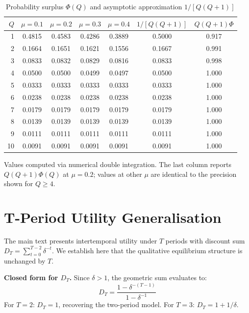 \documentclass[
    oneside,
    fontsize=10pt,leqno]{article}
\begin{document}
\begin{table}[H]
\centering
\caption{\label{tab:phi_values}Probability surplus $\Phi(Q)$ and
asymptotic approximation $1/[Q(Q+1)]$}
\smallskip
\begin{tabular}{rcccccc}
\toprule
$Q$ & $\mu=0.1$ & $\mu=0.2$ & $\mu=0.3$ & $\mu=0.4$
    & $1/[Q(Q\!+\!1)]$ & $Q(Q\!+\!1)\Phi$\\
\midrule
1  & 0.4815 & 0.4583 & 0.4286 & 0.3889 & 0.5000 & 0.917\\
2  & 0.1664 & 0.1651 & 0.1621 & 0.1556 & 0.1667 & 0.991\\
3  & 0.0833 & 0.0832 & 0.0829 & 0.0816 & 0.0833 & 0.998\\
4  & 0.0500 & 0.0500 & 0.0499 & 0.0497 & 0.0500 & 1.000\\
5  & 0.0333 & 0.0333 & 0.0333 & 0.0333 & 0.0333 & 1.000\\
6  & 0.0238 & 0.0238 & 0.0238 & 0.0238 & 0.0238 & 1.000\\
7  & 0.0179 & 0.0179 & 0.0179 & 0.0179 & 0.0179 & 1.000\\
8  & 0.0139 & 0.0139 & 0.0139 & 0.0139 & 0.0139 & 1.000\\
9  & 0.0111 & 0.0111 & 0.0111 & 0.0111 & 0.0111 & 1.000\\
10 & 0.0091 & 0.0091 & 0.0091 & 0.0091 & 0.0091 & 1.000\\
\bottomrule
\end{tabular}
\begin{minipage}{\textwidth}
\smallskip
{\footnotesize Values computed via numerical double integration. The
last column reports $Q(Q+1)\Phi(Q)$ at $\mu=0.2$; values at other
$\mu$ are identical to the precision shown for $Q\geq4$.}
\end{minipage}
\end{table}

\section{T-Period Utility Generalisation}\label{sec:appendix_Tperiod}

The main text presents intertemporal utility under $T$ periods with
discount sum $D_{T}=\sum_{t=0}^{T-2}\delta^{-t}$. We establish
here that the qualitative equilibrium structure is unchanged by $T$.

\medskip
\noindent\textbf{Closed form for $D_{T}$.} Since $\delta>1$, the
geometric sum evaluates to:
\[
D_{T}=\frac{1-\delta^{-(T-1)}}{1-\delta^{-1}}
\]
For $T=2$: $D_{T}=1$, recovering the two-period model. For $T=3$:
$D_{T}=1+1/\delta$.
\end{document}
